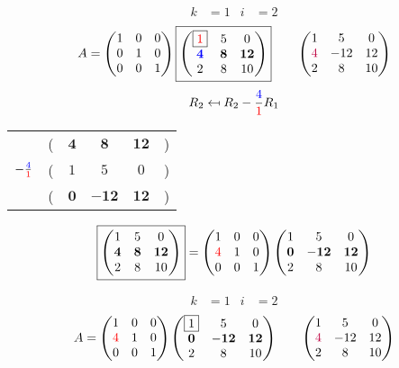 \documentclass[pdf]{beamer}
\begin{document}
\begin{frame}{}\begin{align*} k &= 1 & i &= 2 \end{align*} $$A=\begin{pmatrix}1&0&0\\0&1&0\\0&0&1\end{pmatrix} \boxed{\begin{pmatrix}\boxed{{\color{red}1}}&5&0\\\mathbf{{\color{blue}4}}&\mathbf{8}&\mathbf{12}\\2&8&10\end{pmatrix}} \quad\quad \begin{pmatrix}1&5&0\\{\color{purple}4}&-12&12\\2&8&10\end{pmatrix}$$ $$R_2 \mapsfrom R_2 - \frac{{\color{blue}4}}{{\color{red}1}} R_1$$ \begin{center}\begin{tabular}{cccccc}  &(& $ \mathbf{4} $ & $ \mathbf{8} $ & $ \mathbf{12} $ &)\\$ -\frac{{\color{blue}4}}{{\color{red}1}} $&(& $ 1 $ & $ 5 $ & $ 0 $ &)\\\hline  &(& $ \mathbf{0} $ & $ \mathbf{-12} $ & $ \mathbf{12} $ &) \end{tabular}\end{center} $$ \boxed{\begin{pmatrix}1&5&0\\\mathbf{4}&\mathbf{8}&\mathbf{12}\\2&8&10\end{pmatrix}} = \begin{pmatrix}1&0&0\\{\color{red}4}&1&0\\0&0&1\end{pmatrix} \begin{pmatrix}1&5&0\\\mathbf{0}&\mathbf{-12}&\mathbf{12}\\2&8&10\end{pmatrix} $$\end{frame}
\begin{frame}{}\begin{align*} k &= 1 & i &= 2 \end{align*}$$A=\begin{pmatrix}1&0&0\\{\color{red}4}&1&0\\0&0&1\end{pmatrix} \begin{pmatrix}\boxed{1}&5&0\\\mathbf{0}&\mathbf{-12}&\mathbf{12}\\2&8&10\end{pmatrix} \quad\quad \begin{pmatrix}1&5&0\\{\color{purple}4}&-12&12\\2&8&10\end{pmatrix}$$\end{frame}
\end{document}
